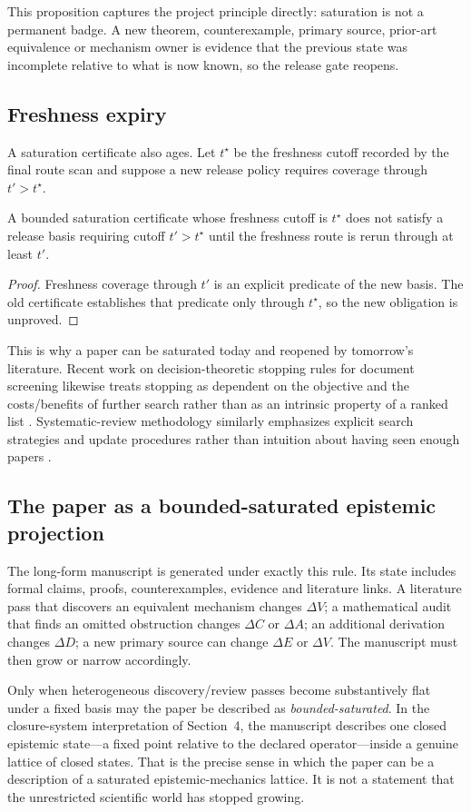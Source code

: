This proposition captures the project principle directly: saturation is not a permanent badge. A new theorem, counterexample, primary source, prior-art equivalence or mechanism owner is evidence that the previous state was incomplete relative to what is now known, so the release gate reopens.

\subsection{Freshness expiry}

A saturation certificate also ages. Let \(t^\star\) be the freshness cutoff recorded by the final route scan and suppose a new release policy requires coverage through \(t'>t^\star\).

\begin{proposition}
A bounded saturation certificate whose freshness cutoff is \(t^\star\) does not satisfy a release basis requiring cutoff \(t'>t^\star\) until the freshness route is rerun through at least \(t'\).
\end{proposition}

\begin{proof}
Freshness coverage through \(t'\) is an explicit predicate of the new basis. The old certificate establishes that predicate only through \(t^\star\), so the new obligation is unproved.
\end{proof}

This is why a paper can be saturated today and reopened by tomorrow's literature. Recent work on decision-theoretic stopping rules for document screening likewise treats stopping as dependent on the objective and the costs/benefits of further search rather than as an intrinsic property of a ranked list \cite{fletcher2026}. Systematic-review methodology similarly emphasizes explicit search strategies and update procedures rather than intuition about having seen enough papers \cite{macfarlane2022}.

\subsection{The paper as a bounded-saturated epistemic projection}

The long-form manuscript is generated under exactly this rule. Its state includes formal claims, proofs, counterexamples, evidence and literature links. A literature pass that discovers an equivalent mechanism changes \(\Delta V\); a mathematical audit that finds an omitted obstruction changes \(\Delta C\) or \(\Delta A\); an additional derivation changes \(\Delta D\); a new primary source can change \(\Delta E\) or \(\Delta V\). The manuscript must then grow or narrow accordingly.

Only when heterogeneous discovery/review passes become substantively flat under a fixed basis may the paper be described as \emph{bounded-saturated}. In the closure-system interpretation of Section~4, the manuscript describes one closed epistemic state---a fixed point relative to the declared operator---inside a genuine lattice of closed states. That is the precise sense in which the paper can be a description of a saturated epistemic-mechanics lattice. It is not a statement that the unrestricted scientific world has stopped growing.
